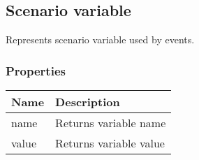 \subsection{Scenario variable}
\label{ScenarioVariable}
Represents scenario variable used by events.
\subsubsection{Properties}
\begin{center}
\begin{tabularx}{\linewidth}{| l | X |}
\hline
\textbf{Name} & \textbf{Description} \\
\hline
name & Returns variable name\\
\hline
value & Returns variable value\\
\hline
\end{tabularx}
\end{center}